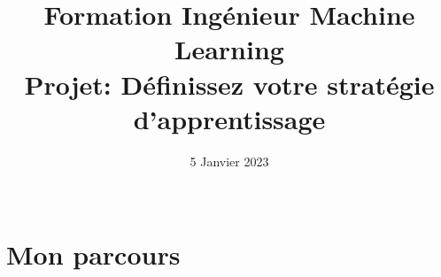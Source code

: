 \documentclass[8pt,xcolor=pdftex,table]{beamer}
\title[]{\vspace{22mm}Formation Ingénieur Machine Learning\\\vspace{6mm}Projet: Définissez votre stratégie d'apprentissage}
\date[]{5 Janvier 2023\\\vspace{18mm}\\\tit{thomas.durandtexte@protonmail.com}}
\begin{document}

\begin{frame}
	\titlepage

\end{frame}






\section{Mon parcours}


\end{document}
